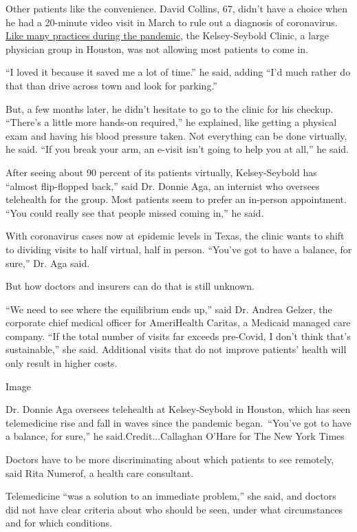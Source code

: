 Other patients like the convenience. David Collins, 67, didn't have a
choice when he had a 20-minute video visit in March to rule out a
diagnosis of coronavirus.
\href{https://www.nytimes.com/2020/03/11/health/telemedicine-coronavirus.html}{Like
many practices during the pandemic}, the Kelsey-Seybold Clinic, a large
physician group in Houston, was not allowing most patients to come in.

``I loved it because it saved me a lot of time.'' he said, adding ``I'd
much rather do that than drive across town and look for parking.''

But, a few months later, he didn't hesitate to go to the clinic for his
checkup. ``There's a little more hands-on required,'' he explained, like
getting a physical exam and having his blood pressure taken. Not
everything can be done virtually, he said. ``If you break your arm, an
e-visit isn't going to help you at all,'' he said.

After seeing about 90 percent of its patients virtually, Kelsey-Seybold
has ``almost flip-flopped back,'' said Dr. Donnie Aga, an internist who
oversees telehealth for the group. Most patients seem to prefer an
in-person appointment. ``You could really see that people missed coming
in,'' he said.

With coronavirus cases now at epidemic levels in Texas, the clinic wants
to shift to dividing visits to half virtual, half in person. ``You've
got to have a balance, for sure,'' Dr. Aga said.

But how doctors and insurers can do that is still unknown.

``We need to see where the equilibrium ends up,'' said Dr. Andrea
Gelzer, the corporate chief medical officer for AmeriHealth Caritas, a
Medicaid managed care company. ``If the total number of visits far
exceeds pre-Covid, I don't think that's sustainable,'' she said.
Additional visits that do not improve patients' health will only result
in higher costs.

Image

Dr. Donnie Aga oversees telehealth at Kelsey-Seybold in Houston, which
has seen telemedicine rise and fall in waves since the pandemic
began.~``You've got to have a balance, for sure,'' he
said.Credit...Callaghan O'Hare for The New York Times

Doctors have to be more discriminating about which patients to see
remotely, said Rita Numerof, a health care consultant.

Telemedicine ``was a solution to an immediate problem,'' she said, and
doctors did not have clear criteria about who should be seen, under what
circumstances and for which conditions.

